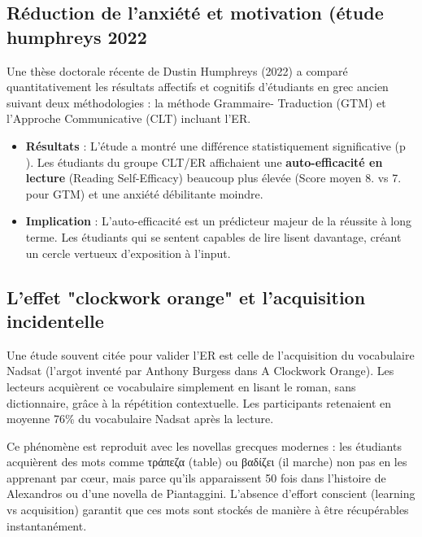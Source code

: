\subsection{Réduction de l'anxiété et motivation (étude humphreys 2022\)}

Une thèse doctorale récente de Dustin Humphreys (2022) a comparé quantitativement les résultats
affectifs et cognitifs d'étudiants en grec ancien suivant deux méthodologies : la méthode Grammaire-
Traduction (GTM) et l'Approche Communicative (CLT) incluant l'ER.

\begin{itemize}\item \textbf{Résultats} : L'étude a montré une différence statistiquement significative (p ). Les étudiants du groupe CLT/ER affichaient une \textbf{auto-efficacité en lecture} (Reading Self-Efficacy) beaucoup plus élevée (Score moyen 8.\cite{III-3-2-ref21} vs 7.\cite{III-3-2-ref54} pour GTM) et une anxiété débilitante moindre.\cite{III-3-2-ref42}\item \textbf{Implication} : L'auto-efficacité est un prédicteur majeur de la réussite à long terme. Les étudiants qui se sentent capables de lire lisent davantage, créant un cercle vertueux d'exposition à l'input.\cite{III-3-2-ref42}\end{itemize}

\subsection{L'effet "clockwork orange" et l'acquisition incidentelle}

Une étude souvent citée pour valider l'ER est celle de l'acquisition du vocabulaire \og Nadsat\fg{}
(l'argot inventé par Anthony Burgess dans A Clockwork Orange). Les lecteurs acquièrent ce
vocabulaire simplement en lisant le roman, sans dictionnaire, grâce à la répétition contextuelle.
Les participants retenaient en moyenne 76\% du vocabulaire Nadsat après la
lecture.\cite{III-3-2-ref43}

Ce phénomène est reproduit avec les novellas grecques modernes : les étudiants acquièrent des mots
comme τράπεζα (table) ou βαδίζει (il marche) non pas en les apprenant par cœur, mais parce qu'ils
apparaissent 50 fois dans l'histoire de Alexandros ou d'une novella de Piantaggini. L'absence
d'effort conscient (learning vs acquisition) garantit que ces mots sont stockés de manière à être
récupérables instantanément.\cite{III-3-2-ref44}



